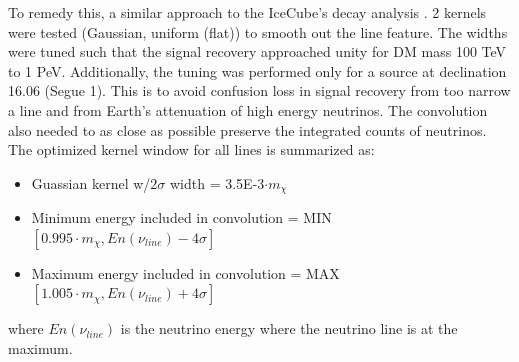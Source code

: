 To remedy this, a similar approach to the IceCube's decay analysis .
2 kernels were tested (Gaussian, uniform (flat)) to smooth out the line feature.
The widths were tuned such that the signal recovery approached unity for DM mass 100 TeV to 1 PeV.
Additionally, the tuning was performed only for a source at declination 16.06 (Segue 1).
This is to avoid confusion loss in signal recovery from too narrow a line and from Earth's attenuation of high energy neutrinos.
The convolution also needed to as close as possible preserve the integrated counts of neutrinos.
The optimized kernel window for all lines is summarized as:
\begin{itemize}
    \item Guassian kernel w/$2 \sigma$ width = 3.5E-3$\cdot m_\chi$
    \item Minimum energy included in convolution = MIN$[0.995 \cdot m_\chi, En(\nu_{line}) -4\sigma]$
    \item Maximum energy included in convolution = MAX$[1.005 \cdot m_\chi, En(\nu_{line}) +4\sigma]$
\end{itemize}
where $En(\nu_{line})$ is the neutrino energy where the neutrino line is at the maximum.

